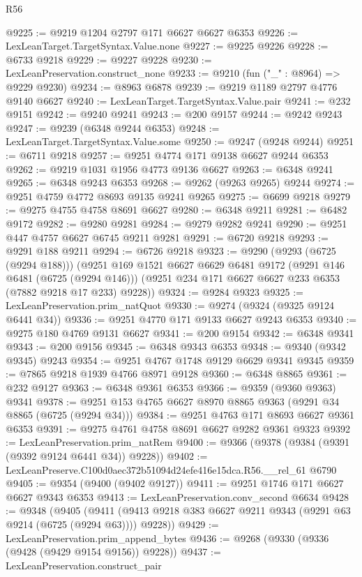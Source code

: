 \begin{lexlean}{R56}
\begin{coremodule}
@9225 := @9219 @1204 @2797 @171 @6627 @6627 @6353
@9226 := LexLeanTarget.TargetSyntax.Value.none
@9227 := @9225 @9226
@9228 := @6733 @9218
@9229 := @9227 @9228
@9230 := LexLeanPreservation.construct_none
@9233 := @9210 (fun ("_" : @8964) => @9229 @9230)
@9234 := @8963 @6878
@9239 := @9219 @1189 @2797 @4776 @9140 @6627
@9240 := LexLeanTarget.TargetSyntax.Value.pair
@9241 := @232 @9151
@9242 := @9240 @9241
@9243 := @200 @9157
@9244 := @9242 @9243
@9247 := @9239 (@6348 @9244 @6353)
@9248 := LexLeanTarget.TargetSyntax.Value.some
@9250 := @9247 (@9248 @9244)
@9251 := @6711 @9218
@9257 := @9251 @4774 @171 @9138 @6627 @9244 @6353
@9262 := @9219 @1031 @1956 @4773 @9136 @6627
@9263 := @6348 @9241
@9265 := @6348 @9243 @6353
@9268 := @9262 (@9263 @9265) @9244
@9274 := @9251 @4759 @4772 @8693 @9135 @9241 @9265
@9275 := @6699 @9218
@9279 := @9275 @4755 @4758 @8691 @6627
@9280 := @6348 @9211
@9281 := @6482 @9172
@9282 := @9280 @9281
@9284 := @9279 @9282 @9241
@9290 := @9251 @447 @4757 @6627 @6745 @9211 @9281
@9291 := @6720 @9218
@9293 := @9291 @188 @9211
@9294 := @6726 @9218
@9323 := @9290
    (@9293 (@6725 (@9294 @188)))
    (@9251
      @169
      @1521
      @6627
      @6629
      @6481
      @9172
      (@9291 @146 @6481 (@6725 (@9294 @146)))
      (@9251 @234 @171 @6627 @6627 @233 @6353 (@7882 @9218 @17 @233) @9228))
@9324 := @9284 @9323
@9325 := LexLeanPreservation.prim_natQuot
@9330 := @9274 (@9324 (@9325 @9124 @6441 @34))
@9336 := @9251 @4770 @171 @9133 @6627 @9243 @6353
@9340 := @9275 @180 @4769 @9131 @6627
@9341 := @200 @9154
@9342 := @6348 @9341
@9343 := @200 @9156
@9345 := @6348 @9343 @6353
@9348 := @9340 (@9342 @9345) @9243
@9354 := @9251 @4767 @1748 @9129 @6629 @9341 @9345
@9359 := @7865 @9218 @1939 @4766 @8971 @9128
@9360 := @6348 @8865
@9361 := @232 @9127
@9363 := @6348 @9361 @6353
@9366 := @9359 (@9360 @9363) @9341
@9378 := @9251 @153 @4765 @6627 @8970 @8865 @9363 (@9291 @34 @8865 (@6725 (@9294 @34)))
@9384 := @9251 @4763 @171 @8693 @6627 @9361 @6353
@9391 := @9275 @4761 @4758 @8691 @6627 @9282 @9361 @9323
@9392 := LexLeanPreservation.prim_natRem
@9400 := @9366 (@9378 (@9384 (@9391 (@9392 @9124 @6441 @34)) @9228))
@9402 := LexLeanPreserve.C100d0aec372b51094d24efe416e15dca.R56.__rel_61 @6790
@9405 := @9354 (@9400 (@9402 @9127))
@9411 := @9251 @1746 @171 @6627 @6627 @9343 @6353
@9413 := LexLeanPreservation.conv_second @6634
@9428 := @9348
    (@9405 (@9411 (@9413 @9218 @383 @6627 @9211 @9343 (@9291 @63 @9214 (@6725 (@9294 @63)))) @9228))
@9429 := LexLeanPreservation.prim_append_bytes
@9436 := @9268 (@9330 (@9336 (@9428 (@9429 @9154 @9156)) @9228))
@9437 := LexLeanPreservation.construct_pair

\end{coremodule}
\end{lexlean}
